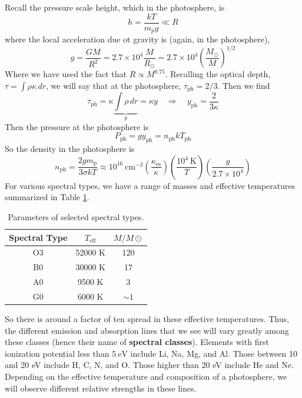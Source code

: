 \documentclass[10pt]{article}
\numberwithin{equation}{section}
\newcommand{\n}{\noindent}
\begin{document}
    Recall the pressure scale height, which in the photosphere, is
    \begin{equation}
      \label{eq:212}
      h=\frac{kT}{m_p g}\ll R
    \end{equation}
    where the local acceleration due ot gravity is (again, in the
    photosphere),
    \begin{equation}
      \label{eq:213}
      g=\frac{GM}{R^2}=2.7\times 10^4\frac{M}{R_\odot}=2.7\times
      10^4\left(\frac{M_\odot}{M}\right)^{1/2}
    \end{equation}
    Where we have used the fact that $R\propto M^{0.75}$. Recalling
    the optical depth, $\tau=\int \rho\kappa\, dr$, we will say that at
    the photosphere, $\tau_{\mathrm{ph}}=2/3$. Then we find
    \begin{equation}
      \label{eq:214}
      \tau_{\mathrm{ph}}=\kappa\underbrace{\int \rho\, dr}_{y}=\kappa
      y\quad\Rightarrow\quad y_{\mathrm{ph}}=\frac{2}{3\kappa}
    \end{equation}
    Then the pressure at the photosphere is
    \begin{equation}
      \label{eq:215}
      P_{\mathrm{ph}}=gy_{\mathrm{ph}}=n_{\mathrm{ph}}kT_{\mathrm{ph}}
    \end{equation}
    So the density in the photosphere is
    \begin{equation}
      \label{eq:216}
      n_{\mathrm{ph}}=\frac{2g m_\mathrm{p}}{3\sigma k T} \approx
      10^{16}\
        \mathrm{cm^{-3}}\left(\frac{\kappa_{\mathrm{es}}}{\kappa}\right)
\left(\frac{10^4\
          \mathrm{K}}{T}\right)\left(\frac{g}{2.7\times 10^4}\right)
    \end{equation}
    For various spectral types, we have a range of masses and
    effective temperatures summarized in Table \ref{tab:spectral}.\\

    \begin{table}[h]
      \centering
      \begin{tabular}[h]{c c c}
        Spectral Type & $T_{\mathrm{eff}}$ & $M/M\odot$\\
        \hline\hline
        O3 & 52000 K & 120\\
        B0 & 30000 K & 17\\
        A0 & 9500 K & 3\\
        G0 & 6000 K & $\sim 1$
      \end{tabular}
      \caption{Parameters of selected spectral types.}
      \label{tab:spectral}
    \end{table}
    \n So there is around a factor of ten spread in these effective
    temperatures. Thus, the different emission and absorption lines
    that we see will vary greatly among these classes (hence their
    name of \textbf{spectral classes}). Elements with first
    ionization potential less than $5\ \mathrm{eV}$ include Li, Na,
    Mg, and Al. Those between 10 and 20 eV include H, C, N, and
    O. Those higher than 20 eV include He and Ne. Depending on the
    effective temperature and composition of a photosphere, we will
    observe different relative strengths in these lines.\\
\end{document}
